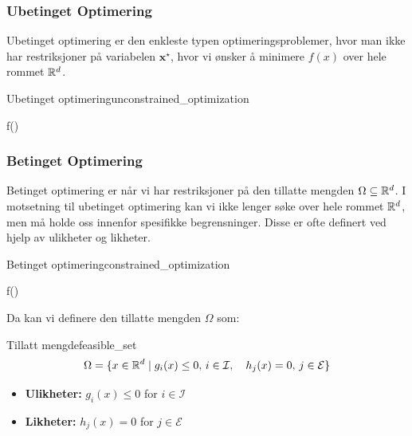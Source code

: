 \subsubsection{Ubetinget Optimering}
Ubetinget optimering er den enkleste typen optimeringsproblemer, hvor man ikke har restriksjoner på variabelen \(\symbf{x}^\star\), hvor vi ønsker å minimere \(f(x)\) over hele rommet \(\mathbb{R}^d\).
\begin{definition}{Ubetinget optimering}{unconstrained_optimization}
\begin{mini!}{}{f()}{}{}
\label{eq:unconstrained_optimization}
\end{mini!}
\end{definition}

\subsubsection{Betinget Optimering}
Betinget optimering er når vi har restriksjoner på den tillatte mengden \(\Omega \subseteq \mathbb{R}^d\). I motsetning til ubetinget optimering kan vi ikke lenger søke over hele rommet \(\mathbb{R}^d\), men må holde oss innenfor spesifikke begrensninger.
Disse er ofte definert ved hjelp av ulikheter og likheter.
\begin{definition}{Betinget optimering}{constrained_optimization}
\begin{mini!}{}{f()}{}{}
\label{eq:constrained_optimization}
\end{mini!}
\end{definition}


Da kan vi definere den tillatte mengden \(\Omega\) som:
\begin{definition}{Tillatt mengde}{feasible_set}
	\[
		\Omega = \{ x \in \mathbb{R}^d \mid g_i(x) \leq 0, \, i \in \mathcal{I}, \quad h_j(x) = 0, \, j \in \mathcal{E} \}
	\]
	\begin{itemize}
		\item \textbf{Ulikheter:} \(g_i(x) \leq 0\) for \(i \in \mathcal{I}\)
		\item \textbf{Likheter:} \(h_j(x) = 0\) for \(j \in \mathcal{E}\)
	\end{itemize}
\end{definition}


